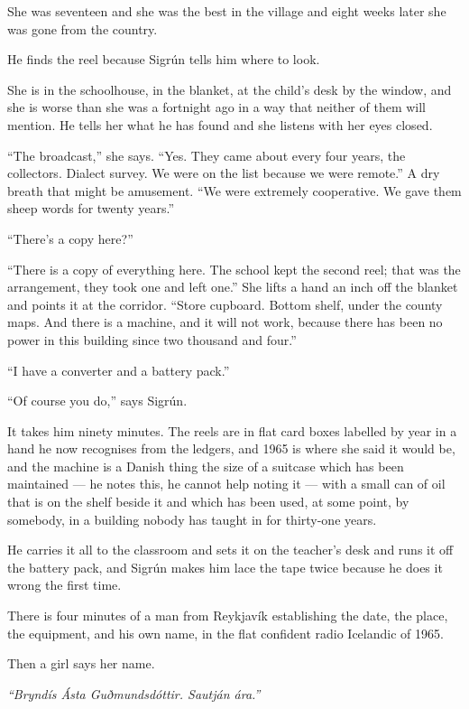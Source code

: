 \documentclass[11pt,oneside]{book}
\newcommand{\sceneline}{%
  \par\vspace{1.2em}
  \begin{center}
    \fontsize{11}{11}\selectfont \textbullet\quad\textbullet\quad\textbullet
  \end{center}
  \vspace{0.6em}\noindent\ignorespaces
}
\begin{document}
She was seventeen and she was the best in the village and eight weeks
later she was gone from the country.

\sceneline

He finds the reel because Sigrún tells him where to look.

She is in the schoolhouse, in the blanket, at the child's desk by the
window, and she is worse than she was a fortnight ago in a way that
neither of them will mention. He tells her what he has found and she
listens with her eyes closed.

``The broadcast,'' she says. ``Yes. They came about every four years,
the collectors. Dialect survey. We were on the list because we were
remote.'' A dry breath that might be amusement. ``We were extremely
cooperative. We gave them sheep words for twenty years.''

``There's a copy here?''

``There is a copy of everything here. The school kept the second reel;
that was the arrangement, they took one and left one.'' She lifts a hand
an inch off the blanket and points it at the corridor. ``Store cupboard.
Bottom shelf, under the county maps. And there is a machine, and it will
not work, because there has been no power in this building since two
thousand and four.''

``I have a converter and a battery pack.''

``Of course you do,'' says Sigrún.

It takes him ninety minutes. The reels are in flat card boxes labelled
by year in a hand he now recognises from the ledgers, and 1965 is where
she said it would be, and the machine is a Danish thing the size of a
suitcase which has been maintained --- he notes this, he cannot help
noting it --- with a small can of oil that is on the shelf beside it and
which has been used, at some point, by somebody, in a building nobody
has taught in for thirty-one years.

He carries it all to the classroom and sets it on the teacher's desk and
runs it off the battery pack, and Sigrún makes him lace the tape twice
because he does it wrong the first time.

\sceneline

There is four minutes of a man from Reykjavík establishing the date, the
place, the equipment, and his own name, in the flat confident radio
Icelandic of 1965.

Then a girl says her name.

\emph{``Bryndís Ásta Guðmundsdóttir. Sautján ára.''}
\end{document}
